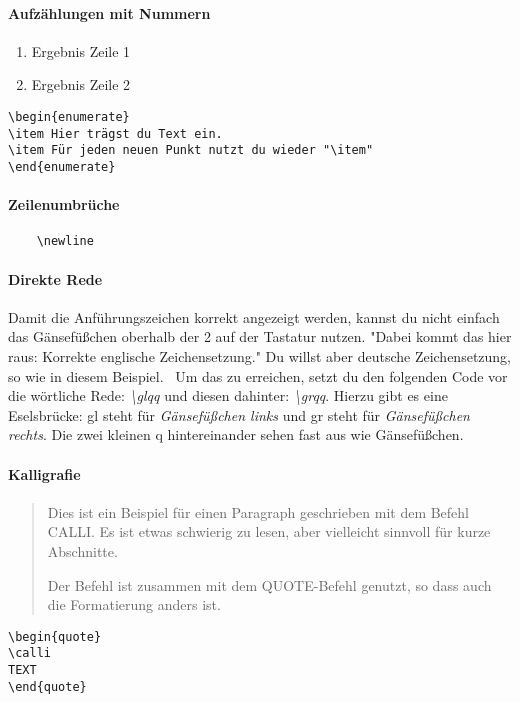\paragraph{Aufzählungen mit Nummern}
\begin{enumerate}
        \item Ergebnis Zeile 1
        \item Ergebnis Zeile 2
    \end{enumerate}
\begin{verbatim}\begin{enumerate}
\item Hier trägst du Text ein.
\item Für jeden neuen Punkt nutzt du wieder "\item"
\end{enumerate}
\end{verbatim}
\paragraph{Zeilenumbrüche} \begin{verbatim}
    \newline
\end{verbatim}
\paragraph{Direkte Rede} Damit die Anführungszeichen korrekt angezeigt werden, kannst du nicht einfach das Gänsefüßchen oberhalb der 2 auf der Tastatur nutzen. "Dabei kommt das hier raus: Korrekte englische Zeichensetzung." Du willst aber deutsche Zeichensetzung, \glqq so wie in diesem Beispiel.\grqq~ Um das zu erreichen, setzt du den folgenden Code vor die wörtliche Rede: \textit{\textbackslash glqq} und diesen dahinter: \textit{\textbackslash grqq}. Hierzu gibt es eine Eselsbrücke: gl steht für \textit{Gänsefüßchen links} und gr steht für \textit{Gänsefüßchen rechts}. Die zwei kleinen q hintereinander sehen fast aus wie Gänsefüßchen.
\paragraph{Kalligrafie}
\begin{quote} \calli
Dies ist ein Beispiel für einen Paragraph geschrieben mit dem Befehl CALLI. Es ist etwas schwierig zu lesen, aber vielleicht sinnvoll für kurze Abschnitte.\newline

Der Befehl ist zusammen mit dem QUOTE-Befehl genutzt, so dass auch die Formatierung anders ist.
\end{quote}
\begin{verbatim}
\begin{quote}
\calli
TEXT
\end{quote}
\end{verbatim}

